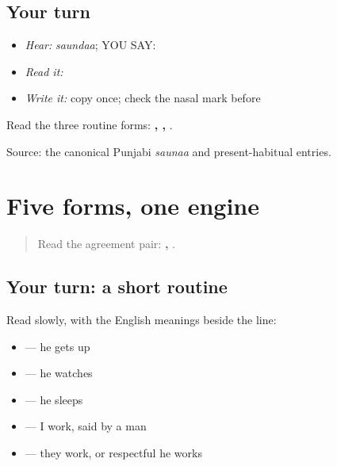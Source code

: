 \subsection*{Your turn}
\begin{itemize}
\raggedright
  \item \emph{Hear:} \emph{saundaa}; YOU SAY: \textbf{}
  \item \emph{Read it:} \textbf{}
  \item \emph{Write it:} copy \textbf{} once; check the nasal mark before \textbf{}
\end{itemize}

\begin{tcolorbox}[breakable,colback=teal!4,colframe=teal!35!black,title={Before you move on}]
Read the three routine forms: \textbf{, , }.

Source: the canonical Punjabi \emph{saunaa} and present-habitual entries.
\end{tcolorbox}
\section[\texorpdfstring{\pa{ਕਰਦਾ}, \pa{ਕਰਦੇ}, \pa{ਉੱਠਦਾ} … (kardaa, karde …)}{ਕਰਦਾ, ਕਰਦੇ, ਉੱਠਦਾ … (kardaa, karde …)}]{Five forms, one engine}

\label{lesson:PA-C183-routine-review}



\begin{quote}
Read the agreement pair: \textbf{, }.
\end{quote}

\subsection*{Your turn: a short routine}
Read slowly, with the English meanings beside the line:

\begin{itemize}
\raggedright
  \item \textbf{  } — he gets up
  \item \textbf{  } — he watches
  \item \textbf{  } — he sleeps
  \item \textbf{   } — I work, said by a man
  \item \textbf{   } — they work, or respectful he works
\end{itemize}

